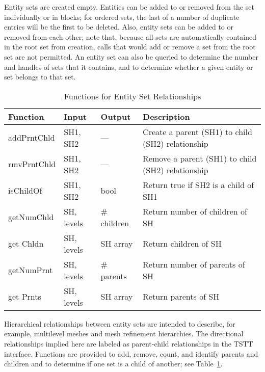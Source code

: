 Entity sets are created empty. Entities can be added to or removed from
the set individually or in blocks; for ordered sets, the last of a
number of duplicate entries will be the first to be deleted.  Also,
entity sets can be added to or removed from each other; note that,
because all sets are automatically contained in the root set from
creation, calls that would add or remove a set from the root set are not
permitted.  An entity set can also be queried to determine the number
and handles of sets that it contains, and to determine whether a given
entity or set belongs to that set.

\begin{table}[tbp]
\caption{Functions for Entity Set Relationships}\label{table:SetRel}
{\small
\begin{tabular}{|p{1.25in}|p{0.75in}|p{0.75in}|p{223pt}|}
\hline 
Function&
Input&
Output&
Description\tabularnewline
\hline
\hline 
addPrntChld&
SH1, SH2&
---&
Create a parent (SH1) to child (SH2) relationship\tabularnewline
\hline 
rmvPrntChld&
SH1, SH2&
---&
Remove a parent (SH1) to child (SH2) relationship\tabularnewline
\hline 
isChildOf&
SH1, SH2&
bool&
Return true if SH2 is a child of SH1\tabularnewline
\hline 
getNumChld&
SH, levels&
\# children&
Return number of children of SH\tabularnewline
\hline 
get Chldn&
SH, levels&
SH array&
Return children of SH\tabularnewline
\hline 
getNumPrnt&
SH, levels&
\# parents&
Return number of parents of SH\tabularnewline
\hline 
get Prnts&
SH, levels&
SH array&
Return parents of SH\tabularnewline
\hline
\end{tabular}
}
\end{table}
Hierarchical relationships between entity sets are intended to describe,
for example, multilevel meshes and mesh refinement hierarchies. The
directional relationships implied here are labeled as parent-child
relationships in the TSTT interface. Functions are provided to add,
remove, count, and identify parents and children and to determine if one
set is a child of another; see Table~\ref{table:SetRel}.

